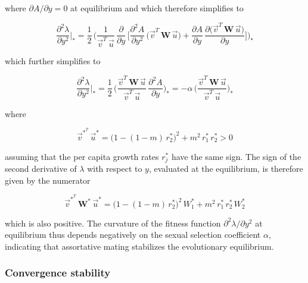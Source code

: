 where $\partial A / \partial y = 0$ at equilibrium and which therefore simplifies to

\begin{equation}
    \frac{\partial^2 \lambda}{\partial y^2}\bigg|_* = \frac{1}{2}\,\Bigg(\frac{1}{\overrightarrow{v}^T\,\overrightarrow{u}}\,\frac{\partial}{\partial y}\,\bigg[\frac{\partial^2 A}{\partial y^2}\,\Big(\overrightarrow{v}^T\,\pmb W\,\overrightarrow{u}\Big)+\frac{\partial A}{\partial y}\,\frac{\partial \big(\overrightarrow{v}^T\,\pmb W\,\overrightarrow{u}\big)}{\partial y}\bigg]\Bigg)_*
\end{equation}

which further simplifies to

\begin{equation}
    \frac{\partial^2 \lambda}{\partial y^2}\bigg|_* = \frac{1}{2}\,\Bigg(\frac{\overrightarrow{v}^T\,\pmb W\,\overrightarrow{u}}{\overrightarrow{v}^T\,\overrightarrow{u}}\,\frac{\partial^2 A}{\partial y}\Bigg)_* = -\alpha \, \Bigg(\frac{\overrightarrow{v}^T\,\pmb W\,\overrightarrow{u}}{\overrightarrow{v}^T\,\overrightarrow{u}}\Bigg)_*
    \label{eq:curvature_final}
\end{equation}

where 

\begin{equation}
    \overrightarrow{v}^*^T\,\overrightarrow{u}^* = \big(1-(1-m)\,r^*_2\big)^2 + m^2\,r^*_1\,r^*_2 > 0
\end{equation}

assuming that the per capita growth rates $r^*_j$ have the same sign. The sign of the second derivative of $\lambda$ with respect to $y$, evaluated at the equilibrium, is therefore given by the numerator

\begin{equation}
    \overrightarrow{v}^*^T\,\pmb W^*\,\overrightarrow{u}^* = \big(1-(1-m)\,r^*_2\big)^2\,W^*_1 + m^2\,r^*_1\,r^*_2\,W^*_2
\end{equation}

which is also positive. The curvature of the fitness function $\partial^2 \lambda / \partial y^2$ at equilibrium thus depends negatively on the sexual selection coefficient $\alpha$, indicating that assortative mating stabilizes the evolutionary equilibrium.

\subsubsection*{Convergence stability}

